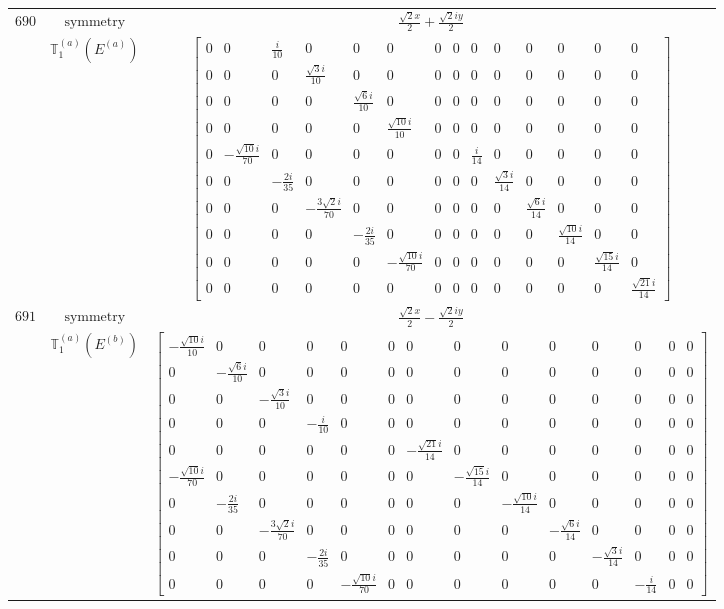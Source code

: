 \documentclass[fleqn,8pt,landscape]{jsarticle}
\begin{document}
\begin{longtable}{ccc}
$ 690 $ & $ \text{symmetry} $ & $ \frac{\sqrt{2} x}{2} + \frac{\sqrt{2} i y}{2} $ \\
$  $ & $ \mathbb{T}_{1}^{(a)}(E^{(a)}) $ & $ \begin{bmatrix} 0 & 0 & \frac{i}{10} & 0 & 0 & 0 & 0 & 0 & 0 & 0 & 0 & 0 & 0 & 0 \\ 0 & 0 & 0 & \frac{\sqrt{3} i}{10} & 0 & 0 & 0 & 0 & 0 & 0 & 0 & 0 & 0 & 0 \\ 0 & 0 & 0 & 0 & \frac{\sqrt{6} i}{10} & 0 & 0 & 0 & 0 & 0 & 0 & 0 & 0 & 0 \\ 0 & 0 & 0 & 0 & 0 & \frac{\sqrt{10} i}{10} & 0 & 0 & 0 & 0 & 0 & 0 & 0 & 0 \\ 0 & - \frac{\sqrt{10} i}{70} & 0 & 0 & 0 & 0 & 0 & 0 & \frac{i}{14} & 0 & 0 & 0 & 0 & 0 \\ 0 & 0 & - \frac{2 i}{35} & 0 & 0 & 0 & 0 & 0 & 0 & \frac{\sqrt{3} i}{14} & 0 & 0 & 0 & 0 \\ 0 & 0 & 0 & - \frac{3 \sqrt{2} i}{70} & 0 & 0 & 0 & 0 & 0 & 0 & \frac{\sqrt{6} i}{14} & 0 & 0 & 0 \\ 0 & 0 & 0 & 0 & - \frac{2 i}{35} & 0 & 0 & 0 & 0 & 0 & 0 & \frac{\sqrt{10} i}{14} & 0 & 0 \\ 0 & 0 & 0 & 0 & 0 & - \frac{\sqrt{10} i}{70} & 0 & 0 & 0 & 0 & 0 & 0 & \frac{\sqrt{15} i}{14} & 0 \\ 0 & 0 & 0 & 0 & 0 & 0 & 0 & 0 & 0 & 0 & 0 & 0 & 0 & \frac{\sqrt{21} i}{14} \end{bmatrix} $ \\ \hline
$ 691 $ & $ \text{symmetry} $ & $ \frac{\sqrt{2} x}{2} - \frac{\sqrt{2} i y}{2} $ \\
$  $ & $ \mathbb{T}_{1}^{(a)}(E^{(b)}) $ & $ \begin{bmatrix} - \frac{\sqrt{10} i}{10} & 0 & 0 & 0 & 0 & 0 & 0 & 0 & 0 & 0 & 0 & 0 & 0 & 0 \\ 0 & - \frac{\sqrt{6} i}{10} & 0 & 0 & 0 & 0 & 0 & 0 & 0 & 0 & 0 & 0 & 0 & 0 \\ 0 & 0 & - \frac{\sqrt{3} i}{10} & 0 & 0 & 0 & 0 & 0 & 0 & 0 & 0 & 0 & 0 & 0 \\ 0 & 0 & 0 & - \frac{i}{10} & 0 & 0 & 0 & 0 & 0 & 0 & 0 & 0 & 0 & 0 \\ 0 & 0 & 0 & 0 & 0 & 0 & - \frac{\sqrt{21} i}{14} & 0 & 0 & 0 & 0 & 0 & 0 & 0 \\ - \frac{\sqrt{10} i}{70} & 0 & 0 & 0 & 0 & 0 & 0 & - \frac{\sqrt{15} i}{14} & 0 & 0 & 0 & 0 & 0 & 0 \\ 0 & - \frac{2 i}{35} & 0 & 0 & 0 & 0 & 0 & 0 & - \frac{\sqrt{10} i}{14} & 0 & 0 & 0 & 0 & 0 \\ 0 & 0 & - \frac{3 \sqrt{2} i}{70} & 0 & 0 & 0 & 0 & 0 & 0 & - \frac{\sqrt{6} i}{14} & 0 & 0 & 0 & 0 \\ 0 & 0 & 0 & - \frac{2 i}{35} & 0 & 0 & 0 & 0 & 0 & 0 & - \frac{\sqrt{3} i}{14} & 0 & 0 & 0 \\ 0 & 0 & 0 & 0 & - \frac{\sqrt{10} i}{70} & 0 & 0 & 0 & 0 & 0 & 0 & - \frac{i}{14} & 0 & 0 \end{bmatrix} $ \\ \hline

\end{longtable}
\end{document}
